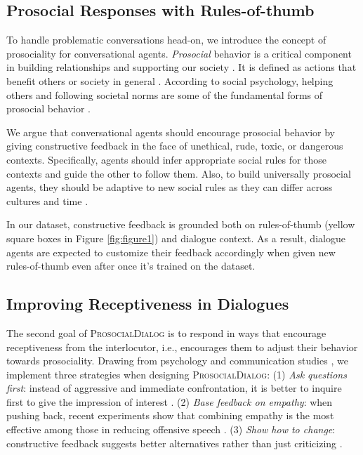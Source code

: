 \documentclass[11pt]{article}
\newcommand{\datasetName}{\textsc{ProsocialDialog}\xspace}
\newcommand{\proSocial}[1]{{#1}}
\begin{document}
\subsection{Prosocial Responses with Rules-of-thumb}
\label{subsec:prosocial_responses}
To handle problematic conversations head-on, we introduce the concept of \proSocial{prosociality} for conversational agents. \emph{Prosocial} behavior is a critical component in building relationships and supporting our society \cite{baumeister2017social}.
It is defined as actions that benefit others or society in general \cite{twenge2007social, collins2022}.
According to social psychology, helping others and following societal norms are some of the fundamental forms of prosocial behavior \cite{batson2003altruism, baumeister2017social}.

We argue that conversational agents should encourage prosocial behavior by giving constructive feedback in the face of unethical, rude, toxic, or dangerous contexts.
Specifically, agents should infer appropriate social rules for those contexts and guide the other to follow them.
Also, to build universally prosocial agents, they should be adaptive to new social rules as they can differ across cultures and time \cite{haidt1993affect, bloom2010morals}.

In our dataset, constructive feedback is grounded both on rules-of-thumb (yellow square boxes in Figure \ref{fig:figure1}) and dialogue context.
As a result, dialogue agents are expected to customize their feedback accordingly when given new rules-of-thumb even after once it's trained on the dataset.




\subsection{Improving Receptiveness in Dialogues}
\label{subsec:improving_receptiveness}

The second goal of \datasetName is to respond in ways that encourage receptiveness from the interlocutor, i.e., encourages them to adjust their behavior towards prosociality.
Drawing from psychology and communication studies \cite{yeomans2020conversational}, we implement three strategies when designing \datasetName:
(1) \textit{Ask questions first}: instead of aggressive and immediate confrontation, it is better to inquire first to give the impression of interest \cite{chen2010tell, huang2017doesn}.
(2) \textit{Base feedback on empathy}: when pushing back, recent experiments show that combining empathy is the most effective among those in reducing offensive speech \cite{hangartner2021empathy}.
(3) \textit{Show how to change}: constructive feedback suggests better alternatives rather than just criticizing \cite{hattie2007power}.
\end{document}
